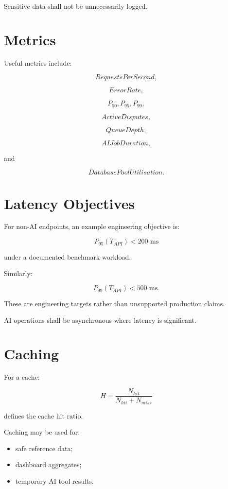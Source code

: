 \documentclass[11pt,a4paper]{article}
\begin{document}
Sensitive data shall not be unnecessarily logged.

\section{Metrics}

Useful metrics include:

\[
RequestsPerSecond,
\]

\[
ErrorRate,
\]

\[
P_{50},
P_{95},
P_{99},
\]

\[
ActiveDisputes,
\]

\[
QueueDepth,
\]

\[
AIJobDuration,
\]

and

\[
DatabasePoolUtilisation.
\]

\section{Latency Objectives}

For non-AI endpoints, an example engineering objective is:

\[
P_{95}(T_{API}) < 200\text{ ms}
\]

under a documented benchmark workload.

Similarly:

\[
P_{99}(T_{API}) < 500\text{ ms}.
\]

These are engineering targets rather than unsupported production claims.

AI operations shall be asynchronous where latency is significant.

\section{Caching}

For a cache:

\[
H
=
\frac{N_{hit}}
{N_{hit}+N_{miss}}
\]

defines the cache hit ratio.

Caching may be used for:

\begin{itemize}
    \item safe reference data;
    \item dashboard aggregates;
    \item temporary AI tool results.
\end{itemize}
\end{document}
